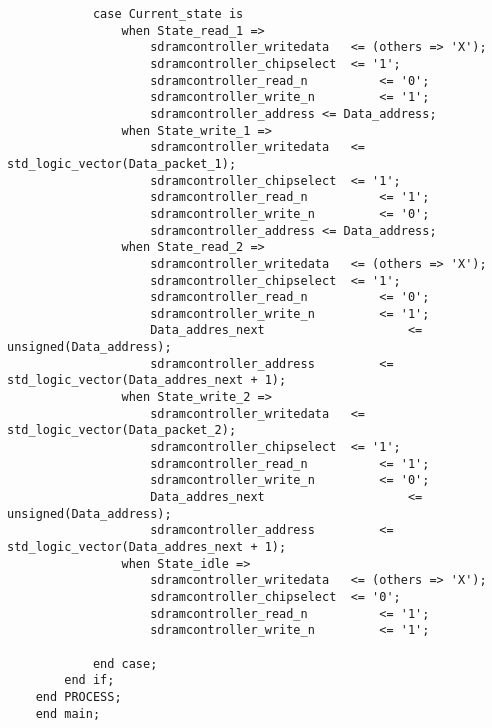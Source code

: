 \begin{lstlisting}
            case Current_state is
                when State_read_1 => 
                    sdramcontroller_writedata 	<= (others => 'X');
                    sdramcontroller_chipselect 	<= '1';
                    sdramcontroller_read_n 			<= '0';
                    sdramcontroller_write_n 		<= '1';
                    sdramcontroller_address <= Data_address;
                when State_write_1 => 
                    sdramcontroller_writedata 	<= std_logic_vector(Data_packet_1);
                    sdramcontroller_chipselect 	<= '1';
                    sdramcontroller_read_n 			<= '1';
                    sdramcontroller_write_n 		<= '0';
                    sdramcontroller_address <= Data_address;
                when State_read_2 => 
                    sdramcontroller_writedata 	<= (others => 'X');
                    sdramcontroller_chipselect 	<= '1';
                    sdramcontroller_read_n 			<= '0';
                    sdramcontroller_write_n 		<= '1';
                    Data_addres_next					<= unsigned(Data_address);
                    sdramcontroller_address 		<= std_logic_vector(Data_addres_next + 1);
                when State_write_2 => 
                    sdramcontroller_writedata 	<= std_logic_vector(Data_packet_2);
                    sdramcontroller_chipselect 	<= '1';
                    sdramcontroller_read_n 			<= '1';
                    sdramcontroller_write_n 		<= '0';
                    Data_addres_next					<= unsigned(Data_address);
                    sdramcontroller_address 		<= std_logic_vector(Data_addres_next + 1);
                when State_idle => 
                    sdramcontroller_writedata 	<= (others => 'X');
                    sdramcontroller_chipselect 	<= '0';
                    sdramcontroller_read_n 			<= '1';
                    sdramcontroller_write_n 		<= '1';
                
            end case;
        end if;
    end PROCESS;
    end main;
\end{lstlisting}
